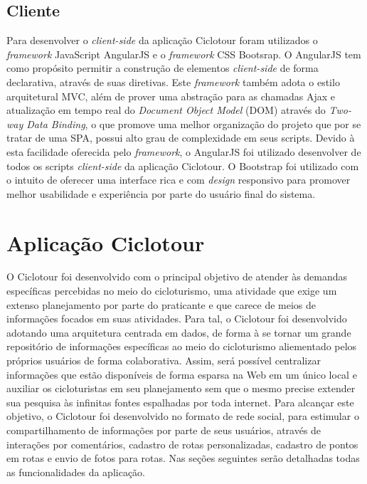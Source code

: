 \subsection{Cliente}
Para desenvolver o \textit{client-side} da aplicação Ciclotour foram utilizados o \textit{framework} JavaScript AngularJS e o \textit{framework} 
CSS Bootsrap. O AngularJS tem como propósito permitir a construção de elementos \textit{client-side} de forma declarativa, através de suas diretivas.
Este \textit{framework} também adota o estilo arquitetural MVC, além de prover uma abstração para as chamadas Ajax e atualização em tempo real do 
\textit{Document Object Model} (DOM) através do \textit{Two-way Data Binding}, o que promove uma melhor organização do projeto que por se tratar de
uma SPA, possui alto grau de complexidade em seus scripts. Devido à esta facilidade oferecida pelo \textit{framework}, o AngularJS foi utilizado 
desenvolver de todos os scripts \textit{client-side} da aplicação Ciclotour. O Bootstrap foi utilizado com o intuito de oferecer uma interface rica 
e com \textit{design} responsivo para promover melhor usabilidade e experiência por parte do usuário final do sistema.

\section{Aplicação Ciclotour}
O Ciclotour foi desenvolvido com o principal objetivo de atender às demandas específicas percebidas no meio do cicloturismo, uma atividade que exige
um extenso planejamento por parte do praticante e que carece de meios de informações focados em suas atividades. Para tal, o Ciclotour foi 
desenvolvido adotando uma arquitetura centrada em dados, de forma à se tornar um grande repositório de informações específicas ao meio do cicloturismo 
aliementado pelos próprios usuários de forma colaborativa. Assim, será possível centralizar informações que estão disponíveis de forma esparsa na Web
em um único local e auxiliar os cicloturistas em seu planejamento sem que o mesmo precise extender sua pesquisa às infinitas fontes espalhadas por 
toda internet. Para alcançar este objetivo, o Ciclotour foi desenvolvido no formato de rede social, para estimular o compartilhamento de informações 
por parte de seus usuários, através de interações por comentários, cadastro de rotas personalizadas, cadastro de pontos em rotas e envio de fotos 
para rotas. Nas seções seguintes serão detalhadas todas as funcionalidades da aplicação.

